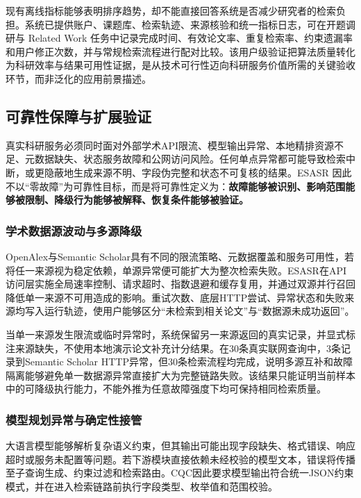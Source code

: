 \documentclass[a4paper,12pt,fontset=none]{ctexart}
\begin{document}
现有离线指标能够表明排序趋势，却不能直接回答系统是否减少研究者的检索负担。系统已提供账户、课题库、检索轨迹、来源核验和统一指标日志，可在开题调研与 Related Work 任务中记录完成时间、有效论文率、重复检索率、约束遗漏率和用户修正次数，并与常规检索流程进行配对比较。该用户级验证把算法质量转化为科研效率与结果可用性证据，是从技术可行性迈向科研服务价值所需的关键验收环节，而非泛化的应用前景描述。

\subsection{可靠性保障与扩展验证}

真实科研服务必须同时面对外部学术API限流、模型输出异常、本地精排资源不足、元数据缺失、状态服务故障和公网访问风险。任何单点异常都可能导致检索中断，或更隐蔽地生成来源不明、字段伪完整和状态不可复核的结果。ESASR 因此不以“零故障”为可靠性目标，而是将可靠性定义为：\textbf{故障能够被识别、影响范围能够被限制、降级行为能够被解释、恢复条件能够被验证。}

\subsubsection{学术数据源波动与多源降级}

OpenAlex与Semantic Scholar具有不同的限流策略、元数据覆盖和服务可用性，若将任一来源视为稳定依赖，单源异常便可能扩大为整次检索失败。ESASR在API访问层实施全局速率控制、请求超时、指数退避和缓存复用，并通过双源并行召回降低单一来源不可用造成的影响。重试次数、底层HTTP尝试、异常状态和失败来源均写入运行轨迹，使用户能够区分“未检索到相关论文”与“数据源未成功返回”。

当单一来源发生限流或临时异常时，系统保留另一来源返回的真实记录，并显式标注来源缺失，不使用本地演示论文补充计分结果。在30条真实联网查询中，3条记录到Semantic Scholar HTTP异常，但30条检索流程均完成，说明多源互补和故障隔离能够避免单一数据源异常直接扩大为完整链路失败。该结果只能证明当前样本中的可降级执行能力，不能外推为任意故障强度下均可保持相同检索质量。

\subsubsection{模型规划异常与确定性接管}

大语言模型能够解析复杂语义约束，但其输出可能出现字段缺失、格式错误、响应超时或服务未配置等问题。若下游模块直接依赖未经校验的模型文本，错误将传播至子查询生成、约束过滤和检索路由。CQC因此要求模型输出符合统一JSON约束模式，并在进入检索链路前执行字段类型、枚举值和范围校验。
\end{document}
